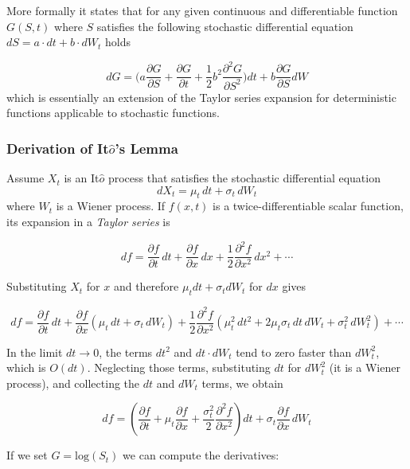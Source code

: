 More formally it states that for any given continuous and differentiable 
function \(G(S, t)\) where \(S\) satisfies the following stochastic differential
equation \(dS=a\cdot dt +b\cdot dW_t\) holds

\begin{equation}
dG = \big(a\frac{\partial G}{\partial S} + \frac{\partial G}{\partial t} + \frac{1}{2}b^2\frac{\partial^2 G}{\partial S^2} \big)dt + b \frac{\partial G}{\partial S}dW
\label{eq:itos_lemma}
\end{equation}
which is essentially an extension of the Taylor series expansion for deterministic functions applicable to stochastic functions.

\begin{attention}
\subsubsection{Derivation of It$\hat{o}$'s Lemma}
Assume $X_t$ is an It$\hat{o}$ process that satisfies the stochastic differential equation
\begin{equation*}	
dX_{t}=\mu_{t}\,dt+\sigma_{t}\,dW_{t}
\end{equation*}
where $W_t$ is a Wiener process. If $f(x, t)$ is a twice-differentiable scalar function, its expansion in a \emph{Taylor series} is
	
\begin{equation*}
df={\frac {\partial f}{\partial t}}\,dt+{\frac {\partial f}{\partial x}}\,dx+{\frac {1}{2}}{\frac {\partial ^{2}f}{\partial x^{2}}}\,dx^{2}+\cdots \end{equation*}

Substituting $X_t$ for $x$ and therefore $\mu_t dt + \sigma_t dW_t$ for $dx$ gives
	
\begin{equation*}
df={\frac {\partial f}{\partial t}}\,dt+{\frac {\partial f}{\partial x}}(\mu _{t}\,dt+\sigma _{t}\,dW_{t})+{\frac {1}{2}}{\frac {\partial ^{2}f}{\partial x^{2}}}\left(\mu _{t}^{2}\,dt^{2}+2\mu _{t}\sigma _{t}\,dt\,dW_{t}+\sigma _{t}^{2}\,dW_{t}^{2}\right)+\cdots 
\end{equation*}

In the limit $dt\rightarrow 0$, the terms $dt^2$ and $dt\cdot dW_t$ tend to zero faster than $dW_t^2$, which is $O(dt)$. Neglecting those terms, 
substituting $dt$ for $dW_t^2$ (it is a Wiener process), 
and collecting the $dt$ and $dW_t$ terms, we obtain
	
\begin{equation*}
df=\left({\frac {\partial f}{\partial t}}+\mu _{t}{\frac {\partial f}{\partial x}}+{\frac {\sigma _{t}^{2}}{2}}{\frac {\partial ^{2}f}{\partial x^{2}}}\right)dt+\sigma _{t}{\frac {\partial f}{\partial x}}\,dW_{t}
\end{equation*}
\end{attention}
If we set \(G = \textrm{log}(S_t)\) we can compute the derivatives:

